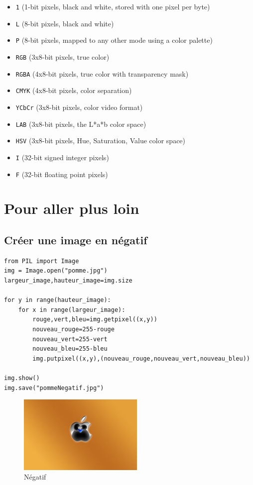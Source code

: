 \documentclass[11pt]{article}
\begin{document}
\begin{itemize}
\item \texttt{1} (1-bit pixels, black and white, stored with one pixel per byte)
\item \texttt{L} (8-bit pixels, black and white)
\item \texttt{P} (8-bit pixels, mapped to any other mode using a color palette)
\item \texttt{RGB} (3x8-bit pixels, true color)
\item \texttt{RGBA} (4x8-bit pixels, true color with transparency mask)
\item \texttt{CMYK} (4x8-bit pixels, color separation)
\item \texttt{YCbCr} (3x8-bit pixels, color video format)
\item \texttt{LAB} (3x8-bit pixels, the L*a*b color space)
\item \texttt{HSV} (3x8-bit pixels, Hue, Saturation, Value color space)
\item \texttt{I} (32-bit signed integer pixels)
\item \texttt{F} (32-bit floating point pixels)
\end{itemize}



\section{Pour aller plus loin}
\label{sec:org3cdbf5c}

\subsection{Créer une image en négatif}
\label{sec:orgbce4c8e}

\begin{verbatim}
from PIL import Image
img = Image.open("pomme.jpg")
largeur_image,hauteur_image=img.size

for y in range(hauteur_image):
    for x in range(largeur_image):
        rouge,vert,bleu=img.getpixel((x,y))
        nouveau_rouge=255-rouge
        nouveau_vert=255-vert
        nouveau_bleu=255-bleu
        img.putpixel((x,y),(nouveau_rouge,nouveau_vert,nouveau_bleu))

img.show()
img.save("pommeNegatif.jpg")
\end{verbatim}

\begin{figure}[htbp]
\centering
\includegraphics[width=6cm]{pommeNegatif.jpg}
\caption{Négatif}
\end{figure}
\end{document}
